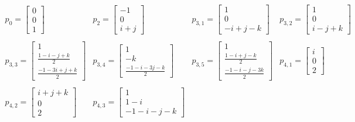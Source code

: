 \documentclass{article}[12pt]
\begin{document}
$$
\begin{array}{cccccc} p_0=\left[ \begin{array}{c} 0 \\ 0 \\ 1 \end{array}\right] & 
  p_{2}=\left[ \begin{array}{c} -1 \\ 0 \\ i+j \end{array}\right] &
  p_{3,1}=\left[ \begin{array}{c} 1 \\ 0 \\ -i+j-k\end{array}\right] &
  p_{3,2}=\left[ \begin{array}{c} 1 \\ 0 \\ i-j+k\end{array}\right] \\
  \\
  p_{3,3}=\left[ \begin{array}{c} 1 \\ \frac{1-i-j+k}{2} \\ \frac{-1-3i+j+k}{2} \end{array}\right] &
  p_{3,4}=\left[ \begin{array}{c} 1 \\ -k \\  \frac{-1-i-3j-k}{2} \end{array}\right] &
  p_{3,5}=\left[ \begin{array}{c} 1 \\ \frac{1-i+j-k}{2}\\\frac{-1-i-j-3k}{2} \end{array}\right] &
  p_{4,1}=\left[ \begin{array}{c} i \\ 0 \\ 2 \end{array}\right] \\
  \\
  p_{4,2}=\left[ \begin{array}{c} i+j+k\\ 0 \\ 2  \end{array}\right] &
  p_{4,3}=\left[ \begin{array}{c} 1 \\ 1-i \\ -1-i-j-k  \end{array}\right] &

\end{array}$$
\end{document}
